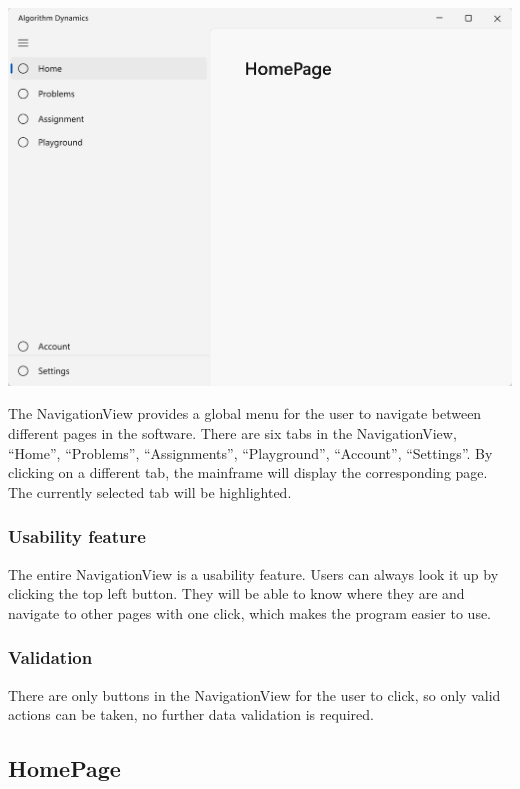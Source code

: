 \documentclass[a4paper]{report}
\begin{document}
\includegraphics[width=\textwidth, height=\textheight, keepaspectratio]{NavigationView-design}

The NavigationView provides a global menu for the user to navigate between different pages in the software. There are six tabs in the NavigationView, ``Home'', ``Problems'', ``Assignments'', ``Playground'', ``Account'', ``Settings''. By clicking on a different tab, the mainframe will display the corresponding page. The currently selected tab will be highlighted.

\subsubsection{Usability feature}

The entire NavigationView is a usability feature. Users can always look it up by clicking the top left button. They will be able to know where they are and navigate to other pages with one click, which makes the program easier to use.

\subsubsection{Validation}

There are only buttons in the NavigationView for the user to click, so only valid actions can be taken, no further data validation is required.

\subsection{HomePage}
\end{document}
